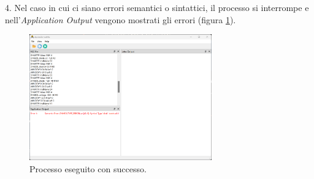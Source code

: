4. Nel caso in cui ci siano errori semantici o sintattici, il processo si interrompe e nell'\textit{Application Output} vengono mostrati gli errori (figura \ref{fig:punto_4}).

\begin{figure}[h!]
	\centering
	\includegraphics[width=0.7\textwidth]{./ImageFiles/semantic error.png}
	\caption{Processo eseguito con successo.}
	\label{fig:punto_4}
\end{figure}






